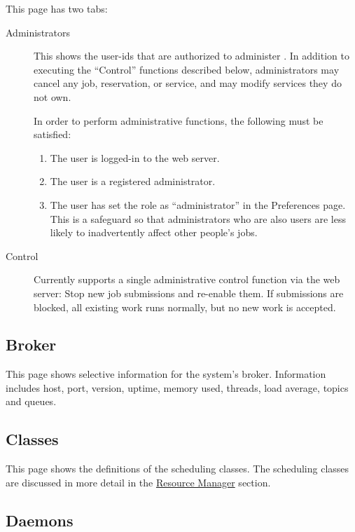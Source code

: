    This page has two tabs:
   \begin{description}   
     \item[Administrators] This shows the user-ids that are authorized to administer
       {\DUCC}.  In addition to executing the ``Control'' functions described below,
       administrators may cancel any job, reservation, or service, and may modify
       services they do not own.  

       In order to perform administrative functions, the following must be satisfied:
       \begin{enumerate}
         \item The user is logged-in to the web server.
         \item The user is a registered administrator.
         \item The user has set the role as ``administrator'' in the {\DUCC} Preferences
           page.  This is a safeguard so that administrators who are also users
           are less likely to inadvertently affect other people's jobs.
       \end{enumerate}
     \item[Control] Currently {\DUCC} supports a single administrative control function
       via the web server: Stop new job submissions and re-enable them.  If submissions
       are blocked, all existing work runs normally, but no new work is accepted.
     \end{description}


\subsection{Broker}
This page shows selective information for the system's broker.
Information includes host, port, version, uptime, memory used, threads, load average, topics and queues.

\subsection{Classes}
This page shows the definitions of the {\DUCC} scheduling classes.  The scheduling classes are
discussed in more detail in the \hyperref[sec:rm.job-classes]{Resource Manager} section.

\subsection{Daemons}
\label{sec:system-details.daemons}

